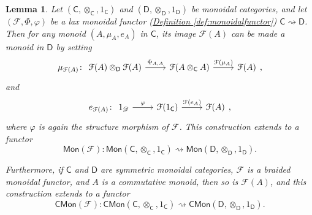 \documentclass[a4paper,10pt]{scrreprt}
\theoremstyle{definition}
\theoremstyle{plain}
\newtheorem{lemma}{Lemma}[section]
\theoremstyle{remark}
\begin{document}
\begin{lemma}
  \label{lemma:monoidalfunctorspreserveinternalmonoids}
  Let $(\mathsf{C}, \otimes_{\mathsf{C}}, 1_{\mathsf{C}})$ and $(\mathsf{D}, \otimes_{\mathsf{D}}, 1_{\mathsf{D}})$ be monoidal categories, and let $(\mathcal{F}, \Phi, \varphi)$ be a lax monoidal functor (\hyperref[def:monoidalfunctor]{Definition \ref*{def:monoidalfunctor}}) $\mathsf{C} \rightsquigarrow \mathsf{D}$. Then for any monoid $(A, \mu_{A}, e_{A})$ in $\mathsf{C}$, its image $\mathcal{F}(A)$ can be made a monoid in $\mathsf{D}$ by setting
  \begin{equation*}
    \mu_{\mathcal{F}(A)}\colon 
    \begin{tikzcd}
      \mathcal{F}(A) \otimes_{\mathsf{D}} \mathcal{F}(A) 
      \arrow[r, "{\Phi_{A, A}}"]
      & \mathcal{F}(A \otimes_{\mathsf{C}} A) 
      \arrow[r, "\mathcal{F}(\mu_{A})"]
      & \mathcal{F}(A)
    \end{tikzcd},
  \end{equation*}
  and
  \begin{equation*}
    e_{\mathcal{F}(A)}\colon
    \begin{tikzcd}
      1_{\mathscr{D}}
      \arrow[r, "\varphi"]
      & \mathcal{F}(1_{\mathsf{C}})
      \arrow[r, "\mathcal{F}(e_{A})"]
      & \mathcal{F}(A)
    \end{tikzcd},
  \end{equation*}
  where $\varphi$ is again the structure morphism of $\mathcal{F}$. This construction extends to a functor 
  \begin{equation*}
    \mathsf{Mon}(\mathcal{F})\colon \mathsf{Mon}(\mathsf{C}, \otimes_{\mathsf{C}}, 1_{\mathsf{C}}) \rightsquigarrow \mathsf{Mon}(\mathsf{D}, \otimes_{\mathsf{D}}, 1_{\mathsf{D}}).
  \end{equation*}

  Furthermore, if $\mathsf{C}$ and $\mathsf{D}$ are symmetric monoidal categories, $\mathcal{F}$ is a braided monoidal functor, and $A$ is a commutative monoid, then so is $\mathcal{F}(A)$, and this construction extends to a functor
  \begin{equation*}
    \mathsf{CMon}(\mathcal{F})\colon \mathsf{CMon}(\mathsf{C}, \otimes_{\mathsf{C}}, 1_{\mathsf{C}}) \rightsquigarrow \mathsf{CMon}(\mathsf{D}, \otimes_{\mathsf{D}}, 1_{\mathsf{D}}). 
  \end{equation*}
\end{lemma} 
\end{document}
